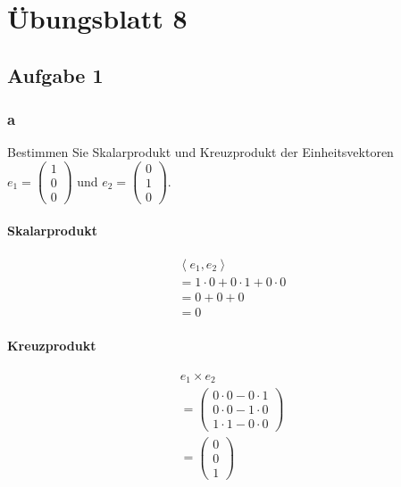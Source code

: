 \chapter{Übungsblatt 8}

\section{Aufgabe 1}

\subsection{a}
Bestimmen Sie Skalarprodukt und Kreuzprodukt der Einheitsvektoren $e_1 = \begin{pmatrix}1 \\ 0 \\ 0\end{pmatrix}$ und $e_2 = \begin{pmatrix}0 \\ 1 \\ 0\end{pmatrix}$.

\subsubsection*{Skalarprodukt}
\begin{align*}
    \left\langle e_1, e_2\right\rangle \\
    = 1 \cdot 0 + 0 \cdot 1 + 0 \cdot 0 \\
    = 0 + 0 + 0 \\
    = 0
\end{align*}

\subsubsection*{Kreuzprodukt}
\begin{align*}
    e_1 \times e_2 \\
    =\begin{pmatrix}
        0 \cdot 0 - 0 \cdot 1 \\
        0 \cdot 0 - 1 \cdot 0 \\
        1 \cdot 1 - 0 \cdot 0
    \end{pmatrix} \\
    = \begin{pmatrix}
        0 \\ 0 \\ 1
    \end{pmatrix}
\end{align*}

